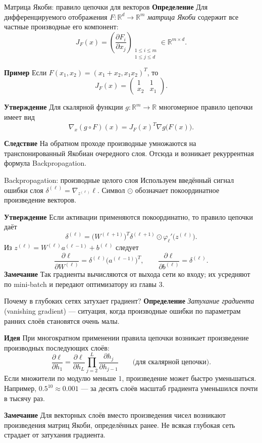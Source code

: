 \documentclass[10pt]{beamer}
\newcommand{\mlBody}{\normalsize}
\newcommand{\mlDefinition}{\textcolor{defblue}{\bfseries Определение}}
\newcommand{\mlStatement}{\textcolor{defblue}{\bfseries Утверждение}}
\newcommand{\mlRemark}{\textcolor{defblue}{\bfseries Замечание}}
\newcommand{\mlConsequence}{\textcolor{defblue}{\bfseries Следствие}}
\newcommand{\mlIdea}{\textcolor{defblue}{\bfseries Идея}}
\newcommand{\mlExample}{\textcolor{defblue}{\bfseries Пример}}
\begin{document}
\begin{frame}{Матрица Якоби: правило цепочки для векторов}
\mlBody
\mlDefinition\; Для дифференцируемого отображения
$F:\mathbb R^d\to\mathbb R^m$ \textit{матрица Якоби}
содержит все частные производные его компонент:
\[
 \boxed{J_F(x)=\left(\frac{\partial F_i}{\partial x_j}\right)_
 {\substack{1\le i\le m\\1\le j\le d}}\in\mathbb R^{m\times d}}.
\]

\mlExample\; Если $F(x_1,x_2)=(x_1+x_2,x_1x_2)^T$, то
\[
 J_F(x)=\begin{pmatrix}1&1\\x_2&x_1\end{pmatrix}.
\]

\mlStatement\; Для скалярной функции $g:\mathbb R^m\to\mathbb R$
многомерное правило цепочки имеет вид
\[
 \boxed{\nabla_x(g\circ F)(x)
 =J_F(x)^T\nabla g\bigl(F(x)\bigr)}.
\]

\mlConsequence\; На обратном проходе производные
умножаются на транспонированный Якобиан очередного слоя.
Отсюда и возникает рекуррентная формула Backpropagation.
\end{frame}

\begin{frame}{Backpropagation: производные целого слоя}
\mlBody
Используем введённый сигнал ошибки слоя
$\delta^{(\ell)}=\nabla_{z^{(\ell)}}\ell$.
Символ $\odot$ обозначает покоординатное произведение векторов.

\mlStatement\; Если активации применяются покоординатно, то правило цепочки даёт
\[
 \boxed{\delta^{(\ell)}=
 \bigl(W^{(\ell+1)}\bigr)^T\delta^{(\ell+1)}
 \odot \varphi_\ell'\bigl(z^{(\ell)}\bigr)}.
\]
Из $z^{(\ell)}=W^{(\ell)}a^{(\ell-1)}+b^{(\ell)}$ следует
\[
 \boxed{\frac{\partial\ell}{\partial W^{(\ell)}}
 =\delta^{(\ell)}\bigl(a^{(\ell-1)}\bigr)^T},
 \qquad
 \frac{\partial\ell}{\partial b^{(\ell)}}=\delta^{(\ell)}.
\]
\mlRemark\; Так градиенты вычисляются от выхода сети ко входу;
их усредняют по mini-batch и передают оптимизатору из главы 3.
\end{frame}


\begin{frame}{Почему в глубоких сетях затухает градиент?}
\mlBody
\mlDefinition\; \textit{Затухание градиента} (vanishing gradient) --- ситуация, когда производные ошибки по параметрам ранних слоёв становятся очень малы.

\mlIdea\; При многократном применении правила цепочки возникает произведение производных последующих слоёв:
\[
 \frac{\partial\ell}{\partial h_1}
 =\frac{\partial\ell}{\partial h_L}
 \prod_{j=2}^{L}\frac{\partial h_j}{\partial h_{j-1}}
 \qquad\text{(для скалярной цепочки)}.
\]
Если множители по модулю меньше $1$, произведение может быстро уменьшаться.
Например, $0.5^{10}\approx0.001$ --- за десять слоёв масштаб градиента
уменьшился почти в тысячу раз.

\mlRemark\; Для векторных слоёв вместо произведения чисел
возникают произведения матриц Якоби, определённых ранее.
Не всякая глубокая сеть страдает от затухания градиента.
\end{frame}
\end{document}
